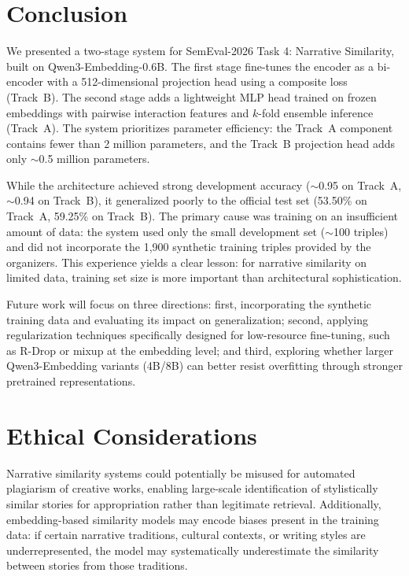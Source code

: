 \documentclass[11pt]{article}
\begin{document}
\section{Conclusion}

We presented a two-stage system for SemEval-2026 Task 4: Narrative Similarity, built on Qwen3-Embedding-0.6B. The first stage fine-tunes the encoder as a bi-encoder with a 512-dimensional projection head using a composite loss (Track~B). The second stage adds a lightweight MLP head trained on frozen embeddings with pairwise interaction features and $k$-fold ensemble inference (Track~A). The system prioritizes parameter efficiency: the Track~A component contains fewer than 2 million parameters, and the Track~B projection head adds only $\sim$0.5 million parameters.

While the architecture achieved strong development accuracy ($\sim$0.95 on Track~A, $\sim$0.94 on Track~B), it generalized poorly to the official test set (53.50\% on Track~A, 59.25\% on Track~B). The primary cause was training on an insufficient amount of data: the system used only the small development set ($\sim$100 triples) and did not incorporate the 1,900 synthetic training triples provided by the organizers. This experience yields a clear lesson: for narrative similarity on limited data, training set size is more important than architectural sophistication.

Future work will focus on three directions: first, incorporating the synthetic training data and evaluating its impact on generalization; second, applying regularization techniques specifically designed for low-resource fine-tuning, such as R-Drop or mixup at the embedding level; and third, exploring whether larger Qwen3-Embedding variants (4B/8B) can better resist overfitting through stronger pretrained representations.


\section{Ethical Considerations}

Narrative similarity systems could potentially be misused for automated plagiarism of creative works, enabling large-scale identification of stylistically similar stories for appropriation rather than legitimate retrieval. Additionally, embedding-based similarity models may encode biases present in the training data: if certain narrative traditions, cultural contexts, or writing styles are underrepresented, the model may systematically underestimate the similarity between stories from those traditions.
\end{document}
